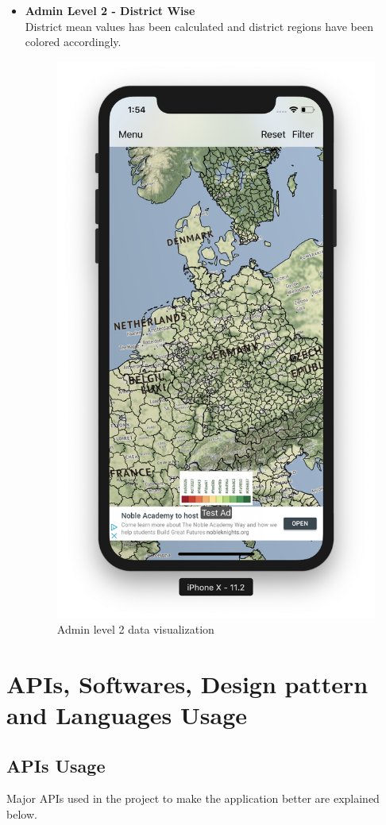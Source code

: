 \begin{itemize}
    \item \textbf{Admin Level 2 - District Wise} \\
    District mean values has been calculated and district regions have been colored accordingly.
    
     \begin{figure}[H]
            \centering
            \includegraphics[width=0.25\linewidth]{figures/ch4/admin_level_2.png}
            \caption{\label{fig:admin_level_2_visual}  Admin level 2 data visualization}
        \end{figure}
    
\end{itemize}


\section{APIs, Softwares, Design pattern and Languages Usage}

\subsection{APIs Usage}

Major APIs used in the project to make the application better are explained below.

